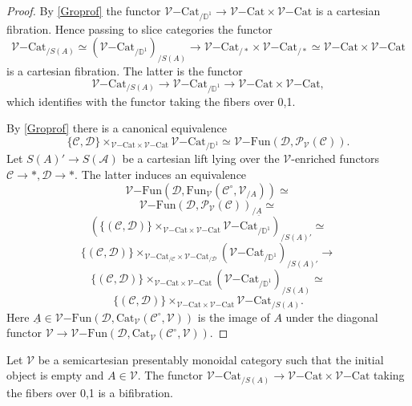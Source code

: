 \documentclass[10pt,oneside]{article}
\numberwithin{equation}{section} %
\numberwithin{figure}{section} %
\theoremstyle{plain}
\theoremstyle{definition}
\newcommand{\bD}{{\mathbb D}}
\newcommand{\mA}{{\mathcal A}}
\newcommand{\mC}{{\mathcal C}}
\newcommand{\mD}{{\mathcal D}}
\newcommand{\mP}{{\mathcal P}}
\newcommand{\mV}{{\mathcal V}}
\newcommand{\Cat}{\mathrm{Cat}}
\newcommand{\Fun}{\mathrm{Fun}}
\begin{document}
\begin{proof}

By \cref{Groprof} the functor $ {\mV\mathrm{-}\Cat}_{/\bD^1} \to {\mV\mathrm{-}\Cat} \times {\mV\mathrm{-}\Cat}$ is a cartesian fibration.
Hence passing to slice categories the functor
$$ {\mV\mathrm{-}\Cat}_{/S(A)} \simeq ({\mV\mathrm{-}\Cat}_{/\bD^1})_{/S(A)} \to {\mV\mathrm{-}\Cat_{/*}} \times {\mV\mathrm{-}\Cat}_{/*} \simeq {\mV\mathrm{-}\Cat} \times {\mV\mathrm{-}\Cat}$$ is a cartesian fibration.
The latter is the functor $$ {\mV\mathrm{-}\Cat}_{/S(A)} \to {\mV\mathrm{-}\Cat}_{/\bD^1} \to {\mV\mathrm{-}\Cat} \times {\mV\mathrm{-}\Cat},$$ which identifies with the functor taking the fibers over 0,1.

By \cref{Groprof} there is a canonical equivalence
$$ \{\mC,\mD\} \times_{{\mV\mathrm{-}\Cat} \times  {\mV\mathrm{-}\Cat}} {\mV\mathrm{-}\Cat}_{/\bD^1} \simeq {\mV\mathrm{-}\Fun}(\mD, \mP_\mV(\mC)).$$
Let $S(A)' \to S(\mA)$ be a cartesian lift lying over the $\mV$-enriched functors
$\mC \to *, \mD \to *.$
The latter induces an equivalence
$$ {\mV\mathrm{-}\Fun}(\mD, {\Fun_\mV}(\mC^\circ,\mV_{/A})) \simeq $$$$ {\mV\mathrm{-}\Fun}(\mD, \mP_\mV(\mC))_{/\underline{A}} \simeq $$
$$ (\{(\mC,\mD)\} \times_{{\mV\mathrm{-}\Cat} \times {\mV\mathrm{-}\Cat}} {\mV\mathrm{-}\Cat}_{/\bD^1})_{/S(A)'} \simeq $$$$ \{(\mC,\mD)\} \times_{{\mV\mathrm{-}\Cat}_{/\mC} \times {\mV\mathrm{-}\Cat}_{/\mD} } ({\mV\mathrm{-}\Cat}_{/\bD^1})_{/S(A)'} \to $$
$$ \{(\mC,\mD)\} \times_{{\mV\mathrm{-}\Cat} \times {\mV\mathrm{-}\Cat}} ({\mV\mathrm{-}\Cat}_{/\bD^1})_{/S(A)} \simeq $$$$\{(\mC,\mD)\} \times_{{\mV\mathrm{-}\Cat} \times {\mV\mathrm{-}\Cat}} {\mV\mathrm{-}\Cat}_{/S(A)}.$$
Here $\underline{A} \in {\mV\mathrm{-}\Fun}(\mD, {\Cat_\mV}(\mC^\circ,\mV)) $ is the image of $A$ under the diagonal functor
$ \mV \to {\mV\mathrm{-}\Fun}(\mD, {\Cat_\mV}(\mC^\circ,\mV)). $
\end{proof}

\begin{corollary}\label{corrbifib}
Let $\mV$ be a semicartesian presentably monoidal category such that the initial object is empty
and $A \in \mV.$
The functor ${\mV\mathrm{-}\Cat_{/S(A)}} \to {\mV\mathrm{-}\Cat} \times {\mV\mathrm{-}\Cat} $ taking the fibers over 0,1 is a bifibration.
    
\end{corollary}
\end{document}
